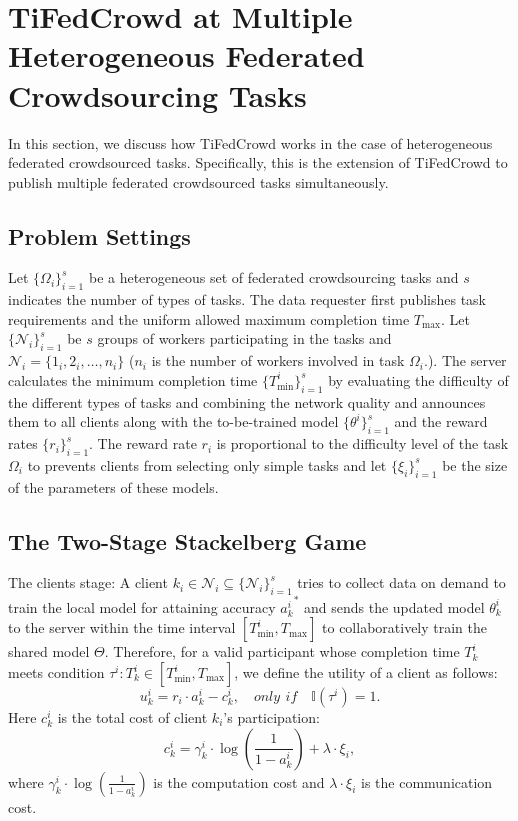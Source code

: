 \documentclass[final,1p,times]{elsarticle}
\begin{document}
\section{TiFedCrowd at Multiple Heterogeneous Federated Crowdsourcing Tasks}
In this section, we discuss how TiFedCrowd works in the case of heterogeneous federated crowdsourced tasks. Specifically, this is the extension of TiFedCrowd to publish multiple federated crowdsourced tasks simultaneously. 
\subsection{Problem Settings}
Let $\{\Omega_i\}_{i=1}^s$ be a heterogeneous set of federated crowdsourcing tasks and $s$ indicates the number of types of tasks. The data requester first publishes task requirements and the uniform allowed maximum completion time $T_{\max}$. Let $\{\bm{\mathcal{N}}_i\}_{i=1}^s$ be $s$ groups of workers participating in the tasks and $\bm{\mathcal{N}}_i = \{1_i,2_i,\dots,n_i\}$ ($n_i$ is the number of workers involved in task $\Omega_i$.). The server calculates the minimum completion time $\{T_{\min}^i\}_{i=1}^s$ by evaluating the difficulty of the different types of tasks and combining the network quality and announces them to all clients along with the to-be-trained model $\{\theta^i\}_{i=1}^s$ and the reward rates $\{r_i\}_{i=1}^s$. The reward rate $r_i$ is proportional to the difficulty level of the task $\Omega_i$ to prevents clients from selecting only simple tasks and let $\{\xi_i\}_{i=1}^s$ be the size of the parameters of these models. 
\subsection{The Two-Stage Stackelberg Game}
The clients stage: A client $k_i\in\bm{\mathcal{N}}_i\subseteq\{\bm{\mathcal{N}}_i\}_{i=1}^s$ tries to collect data on demand to train the local model for attaining accuracy ${a_k^i}^\ast$ and sends the updated model $\theta_k^i$ to the server within the time interval $[T_{\min}^i,T_{\max}]$ to collaboratively train the shared model $\Theta$. Therefore, for a valid participant whose completion time $T_k^i$ meets condition $\tau^i:T_k^i\in[T_{\min}^i,T_{\max}]$, we define the utility of a client as follows:
\begin{equation}
	u_k^i = r_i\cdot a_k^i - c_k^i, \quad only\,\: if\quad\mathbb{I}(\tau^i) = 1.
\end{equation}
Here $c_k^i$ is the total cost of client $k_i$'s participation:
\begin{equation}
	c_k^i = \gamma_k^i\cdot \log(\frac{1}{1-a_k^i})+\lambda\cdot\xi_i,
\end{equation}
where $\gamma_k^i\cdot \log(\frac{1}{1-a_k^i})$ is the computation cost and $\lambda\cdot\xi_i$ is the communication cost.
\end{document}
